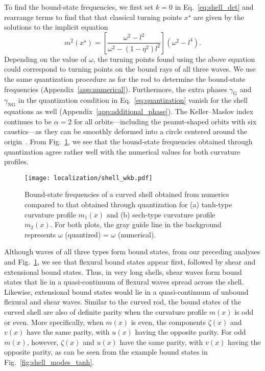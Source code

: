 To find the bound-state frequencies, we first set $k=0$ in Eq.~\eqref{eq:shell_det} and rearrange terms to find that that classical turning points $x^{\star}$ are given by the solutions to the implicit equation
%
\begin{equation}
  m^{2}(x^{\star}) = \left[\frac{\omega^{2} - l^{2}}{\omega^{2} - \left(1-\eta^{2}\right)l^{2}}\right]\left(\omega^{2}-l^{4}\right).
  \label{eq:shell_caustic}
\end{equation}
%
Depending on the value of $\omega$, the turning points found using the above equation could correspond to turning points on the bound rays of all three waves.
We use the same quantization procedure as for the rod to determine the bound-state frequencies (Appendix~\ref{app:numerical}).
Furthermore, the extra phases $\gamma_{\text{G}}$ and $\gamma_{\text{NG}}$ in the quantization condition in Eq.~\eqref{eq:quantization} vanish for the shell equations as well (Appendix~\ref{app:additional_phase}).
The Keller--Maslov index continues to be $\alpha = 2$ for all orbits---including the peanut-shaped orbits with six caustics---as they can be smoothly deformed into a circle centered around the origin~\cite{percival1977}.
From Fig.~\ref{fig:shell_wkb}, we see that the bound-state frequencies obtained through quantization agree rather well with the numerical values for both curvature profiles.
%
\begin{figure}
  \begin{center}
    \texttt{[image: localization/shell\_wkb.pdf]}
  \end{center}
  \caption{
    Bound-state frequencies of a curved shell obtained from numerics compared to that obtained through quantization for (a)
    tanh-type curvature profile $m_{1}(x)$ and (b) sech-type curvature profile $m_{2}(x)$.
    For both plots, the gray guide line in the background represents $\omega$ (quantized) = $\omega$ (numerical).
  }
  \label{fig:shell_wkb}
\end{figure}

Although waves of all three types form bound states, from our preceding analyses and Fig.~\ref{fig:shell_wkb}, we see that flexural bound states appear first, followed by shear and extensional bound states.
Thus, in very long shells, shear waves form bound states that lie in a quasi-continuum of flexural waves spread across the shell.
Likewise, extensional bound states would lie in a quasi-continuum of unbound flexural and shear waves.
Similar to the curved rod, the bound states of the curved shell are also of definite parity when the curvature profile $m(x)$ is odd or even.
More specifically, when $m(x)$ is even, the components $\zeta(x)$ and $v(x)$ have the same parity, with $u(x)$ having the opposite parity.
For odd $m(x)$, however, $\zeta(x)$ and $u(x)$ have the same parity, with $v(x)$ having the opposite parity, as can be seen from the example bound states in Fig.~\ref{fig:shell_modes_tanh}.

